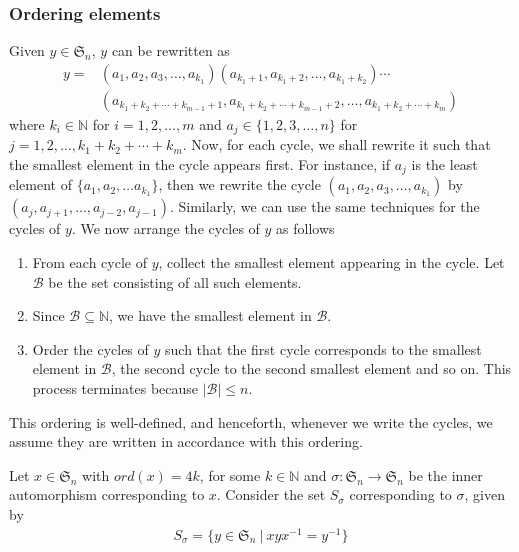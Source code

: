 \documentclass[oneside]{amsart}
\theoremstyle{plain}
\theoremstyle{definition}
\theoremstyle{remark}
\newcommand{\ord}{ord}
\begin{document}
        \subsubsection{Ordering elements}\label{ordering}
        Given $y \in \mathfrak{S}_n$, $y$ can be rewritten as        \begin{align*}\label{y_general_form}
            y = &(a_1, a_2, a_3, \ldots, a_{k_1})(a_{k_1 + 1}, a_{k_1 + 2}, \ldots , a_{k_1 + k_2}) \cdots \\
            &(a_{k_1 + k_2+ \cdots + k_{m - 1} + 1}, a_{k_1 + k_2 + \cdots + k_{m - 1} + 2}, \ldots , a_{k_1 + k_2 + \cdots + k_m})
        \end{align*}
        where $k_i \in \mathbb{N}$ for $i = 1, 2, \ldots, m$ and $a_j \in \{1, 2, 3, \ldots, n\}$ for $j = 1, 2, \dots, k_1 + k_2 + \cdots + k_m$. Now, for each cycle, we shall rewrite it such that the smallest element in the cycle appears first. For instance, if $a_j$ is the least element of $\{a_1, a_2, \ldots a_{k_1}\}$, then we rewrite the cycle $(a_1, a_2, a_3, \ldots, a_{k_1})$ by $(a_{j}, a_{j + 1}, \ldots ,a_{j - 2}, a_{j - 1})$. Similarly, we can use the same techniques for the cycles of $y$. We now arrange the cycles of $y$ as follows
        \begin{enumerate}
            \item From each cycle of $y$, collect the smallest element appearing in the cycle. Let $\mathcal{B}$ be the set consisting of all such elements.
            \item Since $\mathcal{B} \subseteq \mathbb{N}$, we have the smallest element in $\mathcal{B}$.
            \item Order the cycles of $y$ such that the first cycle corresponds to the smallest element in $\mathcal{B}$, the second cycle to the second smallest element and so on. This process terminates because $|\mathcal{B}| \leq n$.
        \end{enumerate}
        This ordering is well-defined, and henceforth, whenever we write the cycles, we assume they are written in accordance with this ordering.
        
        Let $x\in \mathfrak{S}_n$ with $\ord(x) = 4k$, for some $k \in \mathbb{N}$ and $\sigma:\mathfrak{S}_n \to \mathfrak{S}_n$ be the inner automorphism corresponding to $x$. Consider the set $S_{\sigma}$ corresponding to $\sigma$, given by
        \begin{align*}
            S_{\sigma} = \{y \in \mathfrak{S}_n \ | \ xyx^{-1} = y^{-1}\}
        \end{align*}
\end{document}
